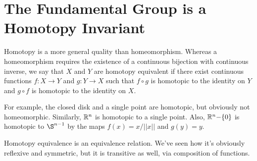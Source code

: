 

\section*{The Fundamental Group is a Homotopy Invariant}
Homotopy is a more general quality than homeomorphism.  Whereas a homeomorphism requires the existence of a continuous bijection with continuous inverse, we say that $X$ and $Y$ are homotopy equivalent if there exist continuous functions $f:X\rightarrow Y$ and $g:Y\rightarrow X$ such that $f\circ g$ is homotopic to the identity on $Y$ and $g\circ f$ is homotopic to the identity on $X$.

For example, the closed disk and a single point are homotopic, but obviously not homeomorphic.  Similarly, $\mathbb{R}^n$ is homotopic to a single point.  Also, $\mathbb{R}^n{-}\{0\}$ is homotopic to $\S^{n-1}$ by the maps $f(x)=x/||x||$ and $g(y)=y$.

Homotopy equivalence is an equivalence relation.  We've seen how it's obviously reflexive and symmetric, but it is transitive as well, via composition of functions.

